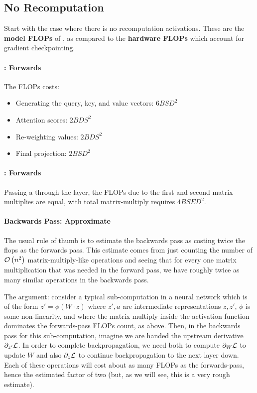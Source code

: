 \documentclass[11pt]{article}
\begin{document}
\subsection{No Recomputation}

Start with the case where there is no recomputation activations.  These are the \textbf{model FLOPs} of
\cite{korthikanti2022reducing}, as compared to the \textbf{hardware FLOPs} which account for gradient
checkpointing.


\paragraph{: Forwards }

The FLOPs costs:
\begin{itemize}
    \item  Generating the query, key, and value vectors: $ 6BSD ^{ 2 } $
    \item Attention scores:  $2BDS ^{ 2 }$
    \item Re-weighting values:  $2BDS ^{ 2 }$
    \item Final projection: $ 2BSD ^{ 2 } $
\end{itemize}

\paragraph{: Forwards}
Passing a  through the  layer, the FLOPs due to the
first and second matrix-multiplies are equal, with total matrix-multiply requires $ 4BSED ^{ 2 } $.

\paragraph{Backwards Pass: Approximate}


The usual rule of thumb is to estimate the backwards pass as costing twice the flops as the forwards
pass. This estimate comes from just counting the number of $ \mathcal{O} \left( n ^{ 2 } \right)$
matrix-multiply-like operations and seeing that for every one matrix multiplication that was needed
in the forward pass, we have roughly twice as many similar operations in the backwards pass.


The argument: consider a typical sub-computation in a neural network which is of the form $ z' =
\phi \left ( W \cdot z \right ) $ where $ z', a $ are intermediate representations $ z, z' $, $ \phi
$ is some non-linearity, and where the matrix multiply inside the activation function dominates the
forwards-pass FLOPs count, as above.  Then, in the backwards pass for this sub-computation, imagine
we are handed the upstream derivative $ \partial _{ z '  } \mathcal{L} $. In order to complete
backpropagation, we need both to compute $ \partial  _{ W }\mathcal{L}  $ to update $ W $ and also $
\partial  _{ z } \mathcal{L}  $ to continue backpropagation to the next layer down. Each of these operations
 will cost about as many FLOPs as the forwards-pass, hence the estimated factor of two (but, as
 we will see, this is a very rough estimate).
\end{document}
